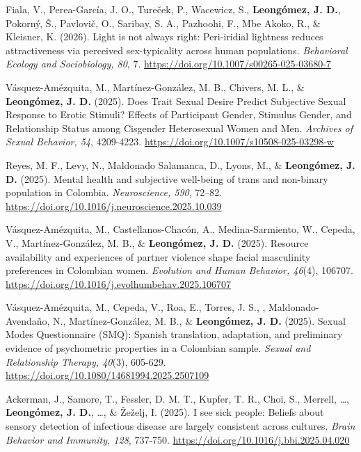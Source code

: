 \documentclass[11pt,a4paper,]{awesome-cv}
\begin{document}
Fiala, V., Perea-García, J. O., Tureček, P., Wacewicz, S.,
\textbf{Leongómez, J. D.}, Pokorný, Š., Pavlovič, O., Saribay, S. A.,
Pazhoohi, F., Mbe Akoko, R., \& Kleisner, K. (2026). Light is not always
right: Peri-iridial lightness reduces attractiveness via perceived
sex-typicality across human populations. \emph{Behavioral Ecology and
Sociobiology, 80}, 7. \url{https://doi.org/10.1007/s00265-025-03680-7}

\textcolor{teal}{\faStar} Vásquez-Amézquita, M., Martínez-González, M.
B., Chivers, M. L., \& \textbf{Leongómez, J. D.} (2025). Does Trait
Sexual Desire Predict Subjective Sexual Response to Erotic Stimuli?
Effects of Participant Gender, Stimulus Gender, and Relationship Status
among Cisgender Heterosexual Women and Men. \emph{Archives of Sexual
Behavior, 54}, 4209-4223.
\url{https://doi.org/10.1007/s10508-025-03298-w}

\textcolor{teal}{\faStar} Reyes, M. F., Levy, N., Maldonado Salamanca,
D., Lyons, M., \& \textbf{Leongómez, J. D.} (2025). Mental health and
subjective well-being of trans and non-binary population in Colombia.
\emph{Neuroscience, 590}, 72--82.
\url{https://doi.org/10.1016/j.neuroscience.2025.10.039}

\textcolor{teal}{\faStar} Vásquez-Amézquita, M., Castellanos-Chacón, A.,
Medina-Sarmiento, W., Cepeda, V., Martínez-González, M. B., \&
\textbf{Leongómez, J. D.} (2025). Resource availability and experiences
of partner violence shape facial masculinity preferences in Colombian
women. \emph{Evolution and Human Behavior, 46}(4), 106707.
\url{https://doi.org/10.1016/j.evolhumbehav.2025.106707}

\textcolor{teal}{\faStar} Vásquez-Amézquita, M., Cepeda, V., Roa, E.,
Torres, J. S., , Maldonado-Avendaño, N., Martínez-González, M. B., \&
\textbf{Leongómez, J. D.} (2025). Sexual Modes Questionnaire (SMQ):
Spanish translation, adaptation, and preliminary evidence of
psychometric properties in a Colombian sample. \emph{Sexual and
Relationship Therapy, 40}(3), 605-629.
\url{https://doi.org/10.1080/14681994.2025.2507109}

Ackerman, J., Samore, T., Fessler, D. M. T., Kupfer, T. R., Choi, S.,
Merrell, \ldots, \textbf{Leongómez, J. D.}, \ldots, \& Žeželj, I.
(2025). I see sick people: Beliefs about sensory detection of infectious
disease are largely consistent across cultures. \emph{Brain Behavior and
Immunity, 128}, 737-750.
\href{https://kwnsfk27.r.eu-west-1.awstrack.me/L0/https:\%2F\%2Fauthors.elsevier.com\%2Fc\%2F1l7WX3AAzzosLe/1/01020196ec980b5c-d02654e9-79d0-4200-95fa-41729e4c03ac-000000/E0s307BmelU4SYULSYXVrUqross=426}{https://doi.org/10.1016/j.bbi.2025.04.020}
\end{document}
